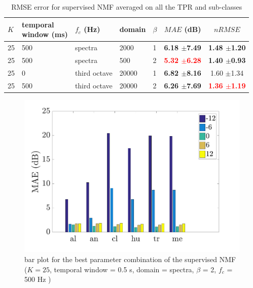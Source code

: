 \documentclass[twocolumn,a4paper,10pt]{article}
\begin{document}
\begin{table}[t]
\centering
\begin{tabular}{lllllcc} 
$K$ & \shortstack{temporal\\window (ms)} & $f_c$ (Hz) & domain & $\beta$ & $MAE$ (dB) & $nRMSE$ \\ 
\hline 
 25 & 500 & spectra &  2000 & 1 & \textbf{6.18 $\pm$7.49} & \textbf{1.48 $\pm$1.20} \\ 
 25 & 500 & spectra &   500 & 2 & \textbf{\textcolor{red}{5.32 $\pm$6.28}} & \textbf{1.40 $\pm$0.93} \\ 
 25 & 0 & third octave & 20000 & 1 & \textbf{6.82 $\pm$8.16} & 1.60 $\pm$1.34\\ 
 25 & 500 & third octave & 20000 & 2 & \textbf{6.26 $\pm$7.69} & \textbf{\textcolor{red}{1.36 $\pm$1.19}} \\ 
\end{tabular} 
\caption{RMSE error for supervised NMF averaged on all the TPR and sub-classes}
\label{tab:results_supervised}
\end{table}

\begin{figure}[h]
\centering
\includegraphics[width=\linewidth]{../image/AmbianceNmfSupervised.pdf}
\caption{bar plot for the best parameter combination of the supervised NMF ($K = 25$, temporal window = 0.5 s, domain = spectra, $\beta$ = 2, $f_c$ = 500 Hz )}
\label{fig:nmfSupervisedAmbiance}
\end{figure}
\end{document}
